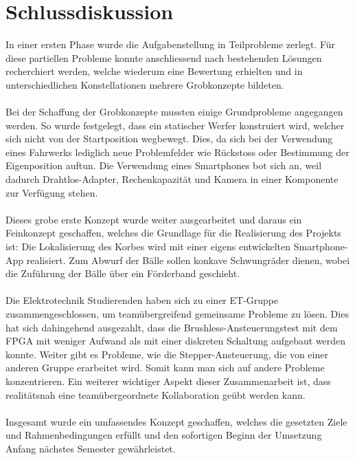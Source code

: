 \section{Schlussdiskussion}
In einer ersten Phase wurde die Aufgabenstellung in Teilprobleme zerlegt. Für diese partiellen 
Probleme konnte anschliessend nach bestehenden Lösungen recherchiert werden, welche wiederum 
eine Bewertung erhielten und in unterschiedlichen Konstellationen mehrere Grobkonzepte bildeten.\\
\\
Bei der Schaffung der Grobkonzepte mussten einige Grundprobleme angegangen werden. So wurde 
festgelegt, dass ein statischer Werfer konstruiert wird, welcher sich nicht von der Startposition 
wegbewegt. Dies, da sich bei der Verwendung eines Fahrwerks lediglich neue Problemfelder wie 
Rückstoss oder Bestimmung der Eigenposition auftun. Die Verwendung eines Smartphones bot sich 
an, weil dadurch Drahtlos-Adapter, Rechenkapazität und Kamera in einer Komponente zur Verfügung 
stehen. \\
\\
Dieses grobe erste Konzept wurde weiter ausgearbeitet und daraus ein Feinkonzept geschaffen, 
welches die Grundlage für die Realisierung des Projekts ist: Die Lokalisierung des Korbes wird 
mit einer eigens entwickelten Smartphone-App realisiert. Zum Abwurf der Bälle sollen konkave 
Schwungräder dienen, wobei die Zuführung der Bälle über ein Förderband 
geschieht. \\
\\
Die Elektrotechnik Studierenden haben sich zu einer ET-Gruppe zusammengeschlossen, um 
teamübergreifend gemeinsame Probleme zu lösen. Dies hat sich dahingehend ausgezahlt, dass 
die Brushless-Ansteuerungstest mit dem FPGA mit weniger Aufwand als mit einer diskreten Schaltung 
aufgebaut werden konnte. Weiter gibt es Probleme, wie die Stepper-Ansteuerung, die von einer anderen 
Gruppe erarbeitet wird. Somit kann man sich auf andere Probleme konzentrieren. Ein weiterer wichtiger 
Aspekt dieser Zusammenarbeit ist, dass realitätsnah eine teamübergeordnete Kollaboration geübt werden 
kann.\\
\\
Insgesamt wurde ein umfassendes Konzept geschaffen, welches die gesetzten Ziele und 
Rahmenbedingungen erfüllt und den sofortigen Beginn der Umsetzung Anfang nächstes Semester 
gewährleistet.